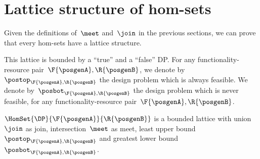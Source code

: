 \section{Lattice structure of \DP hom-sets}

Given the definitions of~$\meet$ and~$\join$ in the previous sections, we can prove that every \DP hom-sets have a lattice structure.

This lattice is bounded by a ``true'' and a ``false'' DP.
For any functionality-resource pair~$\F{\posgenA},\R{\posgenB}$, we denote by~$\postop_{\F{\posgenA},\R{\posgenB}}$ the design problem which is always feasible.
We denote by~$\posbot_{\F{\posgenA},\R{\posgenB}}$ the design problem which is never feasible, for any functionality-resource pair~$\F{\posgenA},\R{\posgenB}$.

\begin{lemma}
    \label{lem:dpboundedlattice}
    $\HomSet{\DP}{\F{\posgenA}}{\R{\posgenB}}$ is a bounded lattice with union~$\join$ as join, intersection~$\meet$ as meet, least upper bound~$\postop_{\F{\posgenA},\R{\posgenB}}$ and greatest lower bound~$\posbot_{\F{\posgenA},\R{\posgenB}}$.
\end{lemma}

